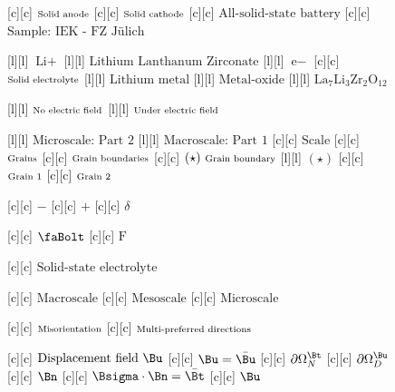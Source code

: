 \begin{figure}[ht]
	\centering
	\footnotesize

	[c] {$\text{\scriptsize Solid anode}$}
	[c] {$\text{\scriptsize Solid cathode}$}
	[c] {$\text{All-solid-state battery}$}
	[c] {$\text{Sample: IEK - FZ Jülich}$}

	[l] {$\text{Li}+$}
	[l] {$\text{Lithium Lanthanum Zirconate}$}
	[l] {$\text{e}-$}
	[c] {$\text{\scriptsize Solid electrolyte}$}
	[l] {$\text{Lithium metal}$}
	[l] {$\text{Metal-oxide}$}
	[l] {$\text{La}_{7}\text{Li}_{3}\text{Zr}_{2}\text{O}_{12}$}

	[l] {$\text{\scriptsize  No electric field}$}
	[l] {$\text{\scriptsize  Under electric field}$}

	[l] {$\text{Microscale: Part 2}$}
	[l] {$\text{Macroscale: Part 1}$}
	[c] {$\text{Scale}$}
	[c] {$\text{\scriptsize Grains}$}
	[c] {$\text{\scriptsize Grain boundaries}$}
	[c] {$(\star)\ \text{\scriptsize Grain boundary}$}
	[l] {$(\star)$}
	[c] {$\text{\scriptsize Grain 1}$}
	[c] {$\text{\scriptsize Grain 2}$}

	[c] {$-$}
	[c] {$+$}
	[c] {$\delta$}

	[c] {$\text{\faBolt}$}
	[c] {$\text{F}$}

	[c] {$\text{Solid-state electrolyte}$}

	[c] {$\text{Macroscale}$}
	[c] {$\text{Mesoscale}$}
	[c] {$\text{Microscale}$}


	[c] {$\text{\scriptsize Misorientation}$}
	[c] {$\text{\scriptsize Multi-preferred directions}$}

	[c] {$\text{Displacement field } \Bu$}
	[c] {$\Bu=\bar{\Bu}$}
	[c] {$\partial\Omega^{\Bt}_{N}$}
	[c] {$\partial\Omega^{\Bu}_{D}$}
	[c] {$\Bn$}
	[c] {$\Bsigma\cdot\Bn = \bar{\Bt}$}
	[c] {$\Bu$}



\end{figure}
